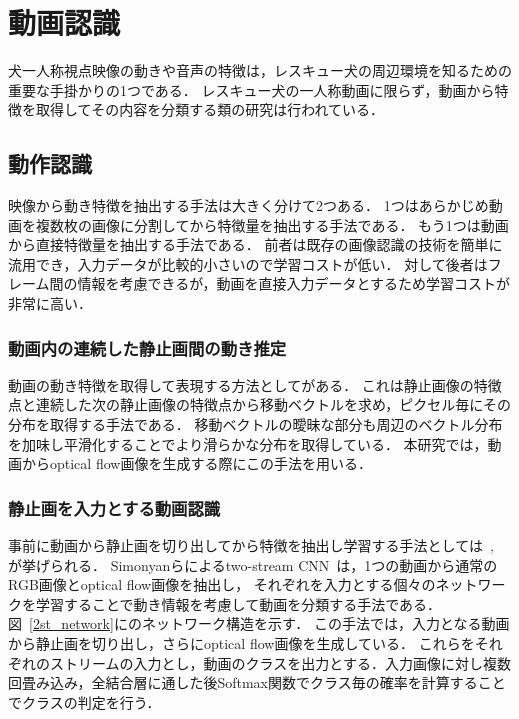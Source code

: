 \section{動画認識}
犬一人称視点映像の動きや音声の特徴は，レスキュー犬の周辺環境を知るための重要な手掛かりの1つである．
レスキュー犬の一人称動画に限らず，動画から特徴を取得してその内容を分類する類の研究は行われている．
\subsection{動作認識}
映像から動き特徴を抽出する手法は大きく分けて2つある．
1つはあらかじめ動画を複数枚の画像に分割してから特徴量を抽出する手法である．
もう1つは動画から直接特徴量を抽出する手法である．
前者は既存の画像認識の技術を簡単に流用でき，入力データが比較的小さいので学習コストが低い．
対して後者はフレーム間の情報を考慮できるが，動画を直接入力データとするため学習コストが非常に高い．
\subsubsection{動画内の連続した静止画間の動き推定}
動画の動き特徴を取得して表現する方法として\cite{Zach2007optical}がある．
これは静止画像の特徴点と連続した次の静止画像の特徴点から移動ベクトルを求め，ピクセル毎にその分布を取得する手法である．
移動ベクトルの曖昧な部分も周辺のベクトル分布を加味し平滑化することでより滑らかな分布を取得している．
本研究では，動画からoptical flow画像を生成する際にこの手法を用いる．
\subsubsection{静止画を入力とする動画認識}
事前に動画から静止画を切り出してから特徴を抽出し学習する手法としては~\cite{simonyan2014two}, \cite{wang2015towards}が挙げられる．
Simonyanらによるtwo-stream CNN~\cite{simonyan2014two}は，1つの動画から通常のRGB画像とoptical flow画像を抽出し，
それぞれを入力とする個々のネットワークを学習することで動き情報を考慮して動画を分類する手法である．
図~\ref{2st_network}に\cite{simonyan2014two}のネットワーク構造を示す．
この手法では，入力となる動画から静止画を切り出し，さらにoptical flow画像を生成している．
これらをそれぞれのストリームの入力とし，動画のクラスを出力とする．入力画像に対し複数回畳み込み，全結合層に通した後Softmax関数でクラス毎の確率を計算することでクラスの判定を行う．

